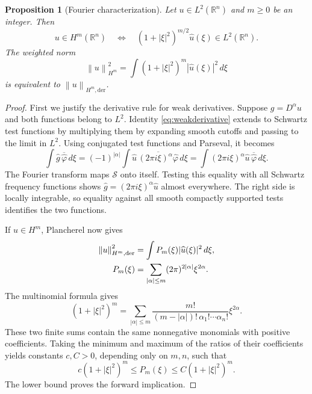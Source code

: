 \documentclass[11pt]{article}
\numberwithin{equation}{section}
\newtheorem{proposition}[theorem]{Proposition}
\theoremstyle{definition}
\theoremstyle{remark}
\newcommand{\R}{\mathbb R}
\newcommand{\Sch}{\mathcal S}
\newcommand{\dd}{\,d}
\newcommand{\norm}[1]{\left\|#1\right\|}
\newcommand{\wh}[1]{\widehat{#1}}
\begin{document}
\begin{proposition}[Fourier characterization]\label{prop:sobolev}
Let \(u\in L^2(\R^n)\) and \(m\ge0\) be an integer. Then
\begin{equation}\label{eq:sobolevcharacterization}
 u\in H^m(\R^n)
 \quad\Longleftrightarrow\quad
 (1+|\xi|^2)^{m/2}\wh u(\xi)\in L^2(\R^n).
\end{equation}
The weighted norm
\begin{equation}\label{eq:fouriernorm}
 \norm u_{H^m}^2=\int(1+|\xi|^2)^m|\wh u(\xi)|^2\dd\xi
\end{equation}
is equivalent to \(\norm u_{H^m,\mathrm{der}}\).
\end{proposition}
\begin{proof}
First we justify the derivative rule for weak derivatives. Suppose \(g=D^\alpha u\) and both functions belong to \(L^2\). Identity \eqref{eq:weakderivative} extends to Schwartz test functions by multiplying them by expanding smooth cutoffs and passing to the limit in \(L^2\). Using conjugated test functions and Parseval, it becomes
\[
 \int\wh g\,\overline{\wh\varphi}\dd\xi
 =(-1)^{|\alpha|}\int\wh u\,
                   \overline{(2\pi i\xi)^\alpha\wh\varphi}\dd\xi
 =\int(2\pi i\xi)^\alpha\wh u\,
                   \overline{\wh\varphi}\dd\xi.
\]
The Fourier transform maps \(\Sch\) onto itself. Testing this equality with all Schwartz frequency functions shows
\(\wh g=(2\pi i\xi)^\alpha\wh u\) almost everywhere. The right side is locally integrable, so equality against all smooth compactly supported tests identifies the two functions.

If \(u\in H^m\), Plancherel now gives
\begin{align}
 \norm u_{H^m,\mathrm{der}}^2
    &=\int P_m(\xi)|\wh u(\xi)|^2\dd\xi,\label{eq:exactweight}\\
 P_m(\xi)&=\sum_{|\alpha|\le m}(2\pi)^{2|\alpha|}\xi^{2\alpha}.\notag
\end{align}
The multinomial formula gives
\[
 (1+|\xi|^2)^m
 =\sum_{|\alpha|\le m}
   \frac{m!}{(m-|\alpha|)!\,\alpha_1!\cdots\alpha_n!}\xi^{2\alpha}.
\]
These two finite sums contain the same nonnegative monomials with positive coefficients. Taking the minimum and maximum of the ratios of their coefficients yields constants \(c,C>0\), depending only on \(m,n\), such that
\begin{equation}\label{eq:weightcomparison}
 c(1+|\xi|^2)^m\le P_m(\xi)\le C(1+|\xi|^2)^m.
\end{equation}
The lower bound proves the forward implication.


\end{proof}
\end{document}
